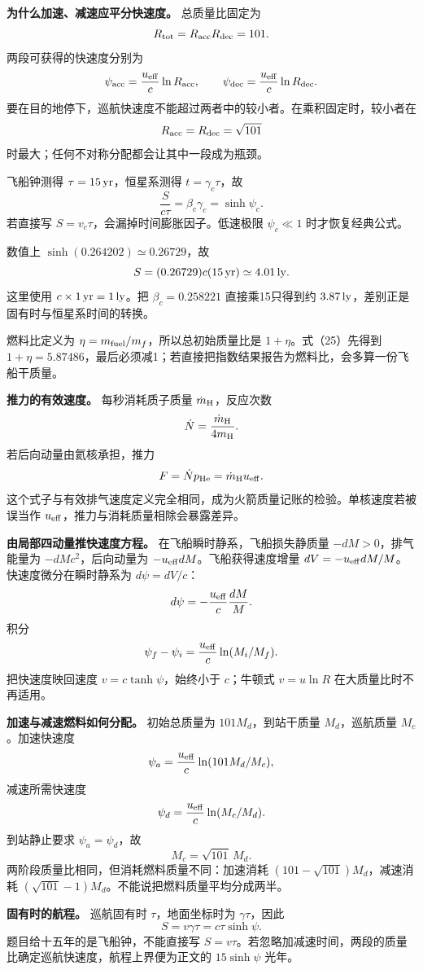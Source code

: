 \documentclass[12pt,a4paper,UTF8]{ctexart}
\begin{document}
\textbf{为什么加速、减速应平分快速度。} 总质量比固定为 \[
R_{\rm tot}=R_{\rm acc}R_{\rm dec}=101.
\] 两段可获得的快速度分别为 \[
\psi_{\rm acc}=\frac{u_{\rm eff}}c\ln R_{\rm acc},
\qquad
\psi_{\rm dec}=\frac{u_{\rm eff}}c\ln R_{\rm dec}.
\]
要在目的地停下，巡航快速度不能超过两者中的较小者。在乘积固定时，较小者在
\[
R_{\rm acc}=R_{\rm dec}=\sqrt{101}
\] 时最大；任何不对称分配都会让其中一段成为瓶颈。

飞船钟测得 \(\tau=15\,{\rm yr}\)，恒星系测得 \(t=\gamma_c\tau\)，故 \[
\frac{S}{c\tau}
=\beta_c\gamma_c
=\sinh\psi_c.
\] 若直接写 \(S=v_c\tau\)，会漏掉时间膨胀因子。低速极限 \(\psi_c\ll1\)
时才恢复经典公式。

数值上 \(\sinh(0.264202)\simeq0.26729\)，故 \[
S=(0.26729)c(15\,{\rm yr})
\simeq4.01\,{\rm ly}.
\] 这里使用 \(c\times1\,{\rm yr}=1\,{\rm ly}\)。把 \(\beta_c=0.258221\)
直接乘15只得到约 \(3.87\,{\rm ly}\)，差别正是固有时与恒星系时间的转换。

燃料比定义为 \(\eta=m_{\rm fuel}/m_f\)，所以总初始质量比是
\(1+\eta\)。式（25）先得到
\(1+\eta=5.87486\)，最后必须减1；若直接把指数结果报告为燃料比，会多算一份飞船干质量。

\textbf{推力的有效速度。} 每秒消耗质子质量 \(\dot m_{\rm H}\)，反应次数
\[
\dot N=\frac{\dot m_{\rm H}}{4m_{\rm H}}.
\] 若后向动量由氦核承担，推力 \[
F=\dot N p_{\rm He}=\dot m_{\rm H}u_{\rm eff}.
\]
这个式子与有效排气速度定义完全相同，成为火箭质量记账的检验。单核速度若被误当作
\(u_{\rm eff}\)，推力与消耗质量相除会暴露差异。

\textbf{由局部四动量推快速度方程。} 在飞船瞬时静系，飞船损失静质量
\(-dM>0\)，排气能量为 \(-dM c^2\)，后向动量为
\(-u_{\rm eff}dM\)。飞船获得速度增量
\(dV=-u_{\rm eff}dM/M\)。快速度微分在瞬时静系为 \(d\psi=dV/c\)： \[
d\psi=-\frac{u_{\rm eff}}c\frac{dM}{M}.
\] 积分 \[
\psi_f-\psi_i=\frac{u_{\rm eff}}c\ln(M_i/M_f).
\] 把快速度映回速度 \(v=c\tanh\psi\)，始终小于 \(c\)；牛顿式
\(v=u\ln R\) 在大质量比时不再适用。

\textbf{加速与减速燃料如何分配。} 初始总质量为 \(101M_d\)，到站干质量
\(M_d\)，巡航质量 \(M_c\)。加速快速度 \[
\psi_a=\frac{u_{\rm eff}}c\ln(101M_d/M_c),
\] 减速所需快速度 \[
\psi_d=\frac{u_{\rm eff}}c\ln(M_c/M_d).
\] 到站静止要求 \(\psi_a=\psi_d\)，故 \[
\boxed{M_c=\sqrt{101}\,M_d}.
\] 两阶段质量比相同，但消耗燃料质量不同：加速消耗
\((101-\sqrt{101})M_d\)，减速消耗
\((\sqrt{101}-1)M_d\)。不能说把燃料质量平均分成两半。

\textbf{固有时的航程。} 巡航固有时 \(\tau\)，地面坐标时为
\(\gamma\tau\)，因此 \[
S=v\gamma\tau=c\tau\sinh\psi.
\] 题目给十五年的是飞船钟，不能直接写
\(S=v\tau\)。若忽略加减速时间，两段的质量比确定巡航快速度，航程上界便为正文的
\(15\sinh\psi\) 光年。
\end{document}
